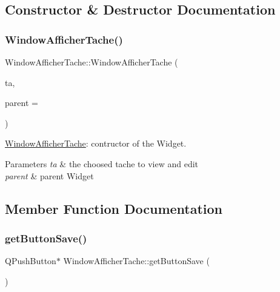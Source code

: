 \subsection{Constructor \& Destructor Documentation}
\mbox{\label{class_window_afficher_tache_a05d3a934243ff05e1120f07c84efd1fc}} 
\subsubsection{\texorpdfstring{Window\+Afficher\+Tache()}{WindowAfficherTache()}}
{\footnotesize\ttfamily Window\+Afficher\+Tache\+::\+Window\+Afficher\+Tache (\begin{DoxyParamCaption}\item[{\hyperlink{class_tache}{Tache} $\ast$}]{ta,  }\item[{Q\+Widget $\ast$}]{parent = {} }\end{DoxyParamCaption})}



\hyperlink{class_window_afficher_tache}{Window\+Afficher\+Tache}\+: contructor of the Widget. 


\begin{DoxyParams}{Parameters}
{\em ta} & the choosed tache to view and edit \\
\hline
{\em parent} & parent Widget \\
\hline
\end{DoxyParams}


\subsection{Member Function Documentation}
\mbox{\label{class_window_afficher_tache_a8a5df0c8f8b2ace2c5f09daa1cbaa7eb}} 
\subsubsection{\texorpdfstring{get\+Button\+Save()}{getButtonSave()}}
{\footnotesize\ttfamily Q\+Push\+Button$\ast$ Window\+Afficher\+Tache\+::get\+Button\+Save (\begin{DoxyParamCaption}{ }\end{DoxyParamCaption})\hspace{0.3cm}{\ttfamily [inline]}}



